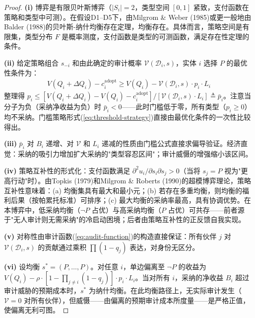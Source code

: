 \documentclass[12pt,a4paper]{ctexart}
\theoremstyle{definition}
\theoremstyle{remark}
\begin{document}
\begin{proof}
\textbf{(i)} 博弈是有限贝叶斯博弈（$|S_i| = 2$，类型空间 $[0,1]$ 紧致，支付函数在策略和类型中可测）。在假设D1--D5下，由Milgrom \& Weber (1985)或更一般地由Balder (1988)的贝叶斯-纳什均衡存在定理，均衡存在。具体而言，策略空间是有限集，类型分布 $F$ 是概率测度，支付函数是类型的可测函数，满足存在性定理的条件。

\textbf{(ii)} 给定策略组合 $s_{-i}$ 和由此确定的审计概率 $\mathcal{V}(\mathcal{D}_i, s)$，实体 $i$ 选择 $P$ 的最优性条件为：
\begin{align}
V(Q_i + \Delta Q_i) - c_i^{\text{adopt}} \geq V(Q_i) - \mathcal{V}(\mathcal{D}_i, s) \cdot p_i \cdot L_i
\end{align}
整理得 $p_i \leq [V(Q_i + \Delta Q_i) - V(Q_i) - c_i^{\text{adopt}}] / [\mathcal{V}(\mathcal{D}_i, s) \cdot L_i] \triangleq \bar{p}_i$。注意当分子为负（采纳净收益为负）时 $\bar{p}_i < 0$——此时门槛低于零，所有类型（$p_i \geq 0$）均不采纳。门槛策略形式(\ref{eq:threshold-strategy})直接由最优化条件的一次性比较得出。

\textbf{(iii)} $\bar{p}_i$ 对 $B_i$ 递增、对 $\mathcal{V}$ 和 $L_i$ 递减的性质由门槛公式直接求偏导验证。经济直觉：采纳的吸引力增加扩大采纳的"类型容忍区间"；审计威慑的增强缩小该区间。

\textbf{(iv)} 策略互补性的形式化：支付函数满足 $\partial^2 u_i / \partial s_i \partial s_j > 0$（当将 $s_j = P$ 视为"更高行动"时）。由Topkis (1979)和Milgrom \& Roberts (1990)的超模博弈理论，策略互补性意味着：(a) 均衡集具有最大和最小元；(b) 若存在多重均衡，则均衡的福利后果（按帕累托标准）可排序；(c) 最大均衡的采纳率最高，具有协调优势。在本博弈中，低采纳均衡（$\neg P$ 占优）与高采纳均衡（$P$ 占优）可共存——前者源于"无人审计则无需采纳"的冷启动困境；后者由策略互补性的正反馈自我实现。

\textbf{(v)} 对称性由审计函数(\ref{eq:audit-function})的构造直接保证：所有伙伴 $j$ 对 $\mathcal{V}(\mathcal{D}_i, s)$ 的贡献通过乘积 $\prod (1 - q_j)$ 表达，对身份无区分。

\textbf{(vi)} 设均衡 $s^* = (P, \ldots, P)$。对任意 $i$，单边偏离至 $\neg P$ 的收益为 $V(Q_i) - \rho \cdot [1 - \prod_{j \neq i} (1 - q_j)] \cdot p_i \cdot L_i$。当对所有 $i$，采纳的净收益 $B_i$ 超过审计威胁的预期成本时，$s^*$ 为纳什均衡。在此均衡路径上，无实际审计发生（$\mathcal{V} = 0$ 对所有伙伴），但威慑——由偏离的预期审计成本所度量——是严格正值，使偏离无利可图。
\end{proof}
\end{document}

